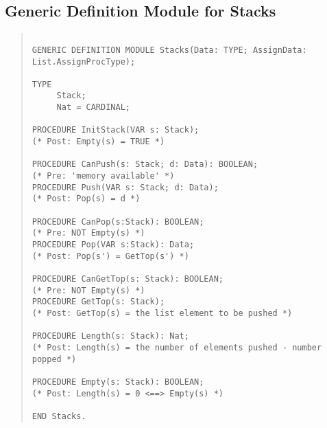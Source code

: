 \subsection{Generic Definition Module for Stacks}
\begin{quote}
\begin{verbatim}

GENERIC DEFINITION MODULE Stacks(Data: TYPE; AssignData: List.AssignProcType);

TYPE
     Stack;
     Nat = CARDINAL;

PROCEDURE InitStack(VAR s: Stack);
(* Post: Empty(s) = TRUE *)

PROCEDURE CanPush(s: Stack; d: Data): BOOLEAN;
(* Pre: 'memory available' *)
PROCEDURE Push(VAR s: Stack; d: Data);
(* Post: Pop(s) = d *)

PROCEDURE CanPop(s:Stack): BOOLEAN;
(* Pre: NOT Empty(s) *)
PROCEDURE Pop(VAR s:Stack): Data;
(* Post: Pop(s') = GetTop(s') *)

PROCEDURE CanGetTop(s: Stack): BOOLEAN;
(* Pre: NOT Empty(s) *)
PROCEDURE GetTop(s: Stack);
(* Post: GetTop(s) = the list element to be pushed *)

PROCEDURE Length(s: Stack): Nat;
(* Post: Length(s) = the number of elements pushed - number popped *)

PROCEDURE Empty(s: Stack): BOOLEAN;
(* Post: Length(s) = 0 <==> Empty(s) *)

END Stacks.
\end{verbatim}
\end{quote}
